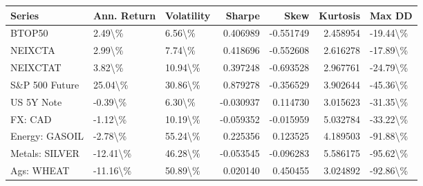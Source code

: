\begin{tabular}{lllrrrl}
\toprule
Series & Ann. Return & Volatility & Sharpe & Skew & Kurtosis & Max DD \\
\midrule
BTOP50 & 2.49\textbackslash \% & 6.56\textbackslash \% & 0.406989 & -0.551749 & 2.458954 & -19.44\textbackslash \% \\
NEIXCTA & 2.99\textbackslash \% & 7.74\textbackslash \% & 0.418696 & -0.552608 & 2.616278 & -17.89\textbackslash \% \\
NEIXCTAT & 3.82\textbackslash \% & 10.94\textbackslash \% & 0.397248 & -0.693528 & 2.967761 & -24.79\textbackslash \% \\
S\&P 500 Future & 25.04\textbackslash \% & 30.86\textbackslash \% & 0.879278 & -0.356529 & 3.902644 & -45.36\textbackslash \% \\
US 5Y Note & -0.39\textbackslash \% & 6.30\textbackslash \% & -0.030937 & 0.114730 & 3.015623 & -31.35\textbackslash \% \\
FX: CAD & -1.12\textbackslash \% & 10.19\textbackslash \% & -0.059352 & -0.015959 & 5.032784 & -33.22\textbackslash \% \\
Energy: GASOIL & -2.78\textbackslash \% & 55.24\textbackslash \% & 0.225356 & 0.123525 & 4.189503 & -91.88\textbackslash \% \\
Metals: SILVER & -12.41\textbackslash \% & 46.28\textbackslash \% & -0.053545 & -0.096283 & 5.586175 & -95.62\textbackslash \% \\
Ags: WHEAT & -11.16\textbackslash \% & 50.89\textbackslash \% & 0.020140 & 0.450455 & 3.024892 & -92.86\textbackslash \% \\
\bottomrule
\end{tabular}
